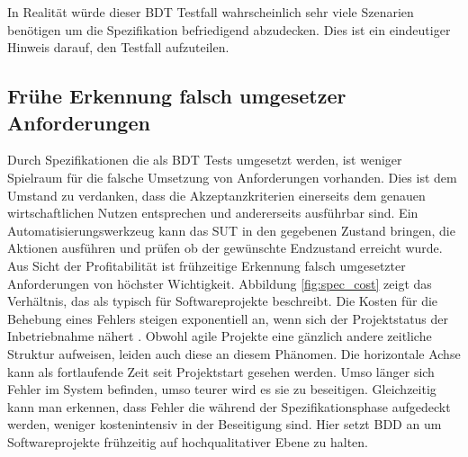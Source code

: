 In Realität würde dieser \Gls{BDT} Testfall wahrscheinlich sehr viele Szenarien benötigen um die Spezifikation befriedigend abzudecken. Dies ist ein eindeutiger Hinweis darauf, den Testfall aufzuteilen.

\subsection{Frühe Erkennung falsch umgesetzer Anforderungen}
Durch Spezifikationen die als \Gls{BDT} Tests umgesetzt werden, ist weniger Spielraum für die falsche Umsetzung von Anforderungen vorhanden. Dies ist dem Umstand zu verdanken, dass die Akzeptanzkriterien einerseits dem genauen wirtschaftlichen Nutzen entsprechen und andererseits ausführbar sind. Ein Automatisierungswerkzeug kann das \Gls{SUT} in den gegebenen Zustand bringen, die Aktionen ausführen und prüfen ob der gewünschte Endzustand erreicht wurde.\\
Aus Sicht der Profitabilität ist frühzeitige Erkennung falsch umgesetzter Anforderungen von höchster Wichtigkeit. Abbildung \ref{fig:spec_cost} zeigt das Verhältnis, das \citeauthor{boehm_software_1981} als typisch für Softwareprojekte beschreibt. Die Kosten für die Behebung eines Fehlers steigen exponentiell an, wenn sich der Projektstatus der Inbetriebnahme nähert \cite{boehm_software_1981}. Obwohl agile Projekte eine gänzlich andere zeitliche Struktur aufweisen, leiden auch diese an diesem Phänomen. Die horizontale Achse kann als fortlaufende Zeit seit Projektstart gesehen werden. Umso länger sich Fehler im System befinden, umso teurer wird es sie zu beseitigen. Gleichzeitig kann man erkennen, dass Fehler die während der Spezifikationsphase aufgedeckt werden, weniger kostenintensiv in der Beseitigung sind. Hier setzt \Gls{BDD} an um Softwareprojekte frühzeitig auf hochqualitativer Ebene zu halten.

